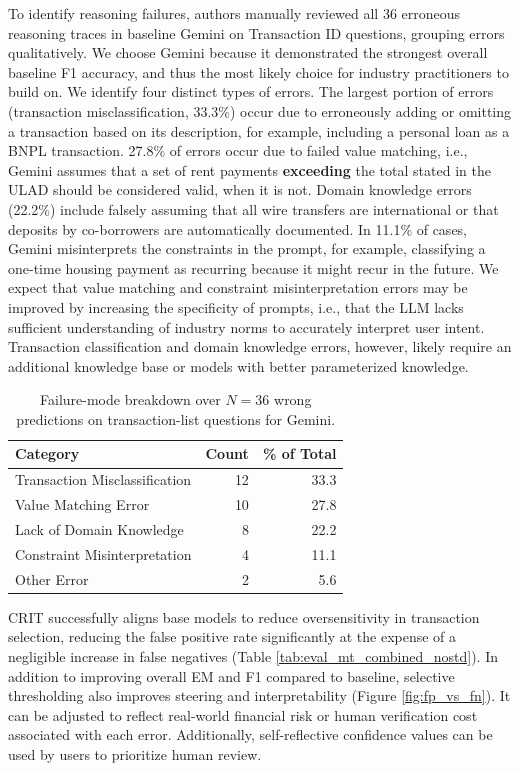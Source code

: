 \documentclass[11pt]{article}
\begin{document}
To identify reasoning failures, authors manually reviewed all 36 erroneous reasoning traces in baseline Gemini on Transaction ID questions, grouping errors qualitatively.
We choose Gemini because it demonstrated the strongest overall baseline F1 accuracy, and thus the most likely choice for industry practitioners to build on.
We identify four distinct types of errors.
The largest portion of errors (transaction misclassification, 33.3\%) occur due to erroneously adding or omitting a transaction based on its description, for example, including a personal loan as a BNPL transaction.
27.8\% of errors occur due to failed value matching, i.e., Gemini assumes that a set of rent payments \textbf{exceeding} the total stated in the ULAD should be considered valid, when it is not.
Domain knowledge errors (22.2\%) include falsely assuming that all wire transfers are international or that deposits by co-borrowers are automatically documented.
In 11.1\% of cases, Gemini misinterprets the constraints in the prompt, for example, classifying a one-time housing payment as recurring because it might recur in the future.
We expect that value matching and constraint misinterpretation errors may be improved by increasing the specificity of prompts, i.e., that the LLM lacks sufficient understanding of industry norms to accurately interpret user intent.
Transaction classification and domain knowledge errors, however, likely require an additional knowledge base or models with better parameterized knowledge.

\begin{table}[H]
\centering
\small
\begin{tabular}{lrr}
\toprule
Category & Count & \% of Total \\
\midrule
Transaction Misclassification & 12 & 33.3 \\
Value Matching Error & 10 & 27.8 \\
Lack of Domain Knowledge & 8 & 22.2 \\
Constraint Misinterpretation & 4 & 11.1 \\
Other Error & 2 & 5.6 \\
\bottomrule
\end{tabular}
\caption{Failure-mode breakdown over $N=36$ wrong predictions on transaction-list questions for Gemini.}
\label{tab:failure_modes_txn}
\end{table}

CRIT successfully aligns base models to reduce oversensitivity in transaction selection, reducing the false positive rate significantly at the expense of a negligible increase in false negatives (Table \ref{tab:eval_mt_combined_nostd}).
In addition to improving overall EM and F1 compared to baseline, selective thresholding also improves steering and interpretability (Figure \ref{fig:fp_vs_fn}).
It can be adjusted to reflect real-world financial risk or human verification cost associated with each error.
Additionally, self-reflective confidence values can be used by users to prioritize human review.
\end{document}
